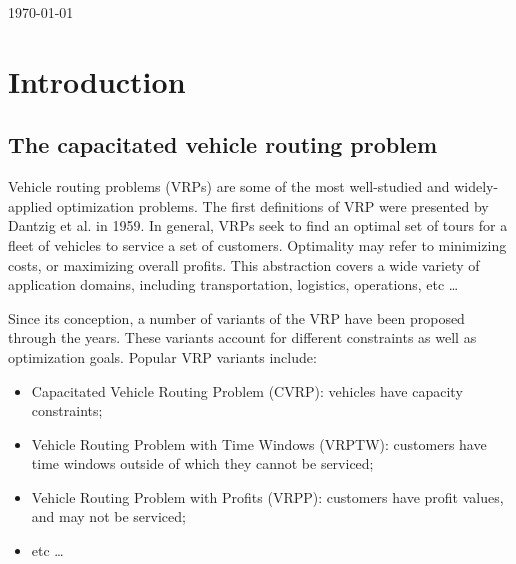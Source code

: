 \documentclass{report}
\begin{document}
\begin{titlepage}


	\vfill\vfill\vfill %

	{\large\today} %

	\vfill %
\end{titlepage}

\tableofcontents
\pagebreak

\chapter{Introduction}
\section{The capacitated vehicle routing problem}
Vehicle routing problems (VRPs) are some of the most well-studied and widely-applied optimization problems. The first definitions of VRP were presented by Dantzig et al. \cite{dantzig1959truck} in 1959. In general, VRPs seek to find an optimal set of tours for a fleet of vehicles to service a set of customers. Optimality may refer to minimizing costs, or maximizing overall profits. This abstraction covers a wide variety of application domains, including transportation, logistics, operations, etc \dots

Since its conception, a number of variants of the VRP have been proposed through the years. These variants account for different constraints as well as optimization goals. Popular VRP variants include:
\begin{itemize}
	\item Capacitated Vehicle Routing Problem (CVRP): vehicles have capacity constraints;
	\item Vehicle Routing Problem with Time Windows (VRPTW): customers have time windows outside of which they cannot be serviced;
	\item Vehicle Routing Problem with Profits (VRPP): customers have profit values, and may not be serviced;
	\item etc \dots
\end{itemize}
\end{document}
